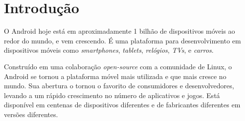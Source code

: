 \documentclass[a4paper,12pt,brazil,oneside]{book}
\begin{document}
\tableofcontents
	
\clearpage %

\singlespace

\lstset{language=[Objective]C}

\listoffigures
\clearpage
{}

\thispagestyle{empty}

\listoftables
\clearpage
{}

\thispagestyle{empty}

\listoflistings
\clearpage
\thispagestyle{empty}


\doublespace
\chapter{Introdução}

O Android hoje está em aproximadamente 1 bilhão de dispositivos móveis ao redor do mundo, e vem crescendo. É uma plataforma para desenvolvimento em dispositivos móveis como \emph{smartphones}, \emph{tablets}, \emph{relógios}, \emph{TVs}, e \emph{carros}. 

Construído em uma colaboração \emph{open-source} com a comunidade de Linux, o Android se tornou a plataforma móvel mais utilizada e que mais cresce no mundo. Sua abertura o tornou o favorito de consumidores e desenvolvedores, levando a um rápido crescimento no número de aplicativos e jogos. Está disponível em centenas de dispositivos diferentes e de fabricantes diferentes em versões diferentes.
\end{document}
